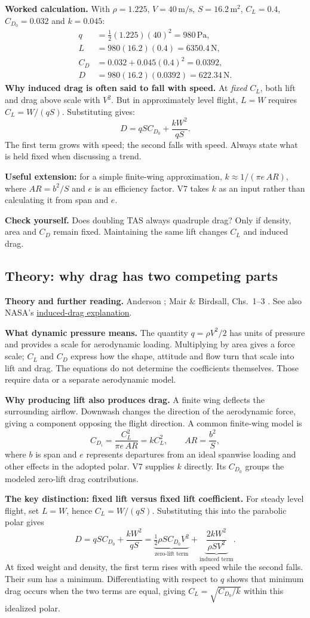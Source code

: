 \documentclass[11pt,letterpaper]{article}
\newcommand{\unit}[1]{\,\mathrm{#1}}
\newcommand{\theorypage}[1]{\clearpage\subsection*{\color{navy}\thesection\enspace Theory: #1}}
\newcommand{\reading}[1]{{\small\color{navy}\textbf{Theory and further reading.} #1\par}\vspace{3pt}}
\newcommand{\selfcheck}[1]{\par\textbf{Check yourself.} #1\par}
\begin{document}
\textbf{Worked calculation.} With $\rho=1.225$, $V=40\unit{m/s}$,
$S=16.2\unit{m^2}$, $C_L=0.4$, $C_{D_0}=0.032$ and $k=0.045$:
\begin{align*}
q&=\tfrac12(1.225)(40)^2=980\unit{Pa},\\
L&=980(16.2)(0.4)=6350.4\unit N,\\
C_D&=0.032+0.045(0.4)^2=0.0392,\\
D&=980(16.2)(0.0392)=622.34\unit N.
\end{align*}
\textbf{Why induced drag is often said to fall with speed.} At \emph{fixed}
$C_L$, both lift and drag above scale with $V^2$. But in approximately level flight,
$L=W$ requires $C_L=W/(qS)$. Substituting gives:
\[
D=qSC_{D_0}+\frac{kW^2}{qS}.
\]
The first term grows with speed; the second falls with speed. Always state what
is held fixed when discussing a trend.

\textbf{Useful extension:} for a simple finite-wing approximation,
$k\approx1/(\pi e\,AR)$, where $AR=b^2/S$ and $e$ is an efficiency factor.
V7 takes $k$ as an input rather than calculating it from span and $e$.
\selfcheck{Does doubling TAS always quadruple drag? Only if density, area and
$C_D$ remain fixed. Maintaining the same lift changes $C_L$ and induced drag.}


\theorypage{why drag has two competing parts}
\reading{Anderson \cite{anderson-performance}; Mair \& Birdsall, Chs.~1--3 \cite{mair}. See also NASA's \href{https://www1.grc.nasa.gov/beginners-guide-to-aeronautics/induced-drag-coefficient/}{induced-drag explanation}.}
\textbf{What dynamic pressure means.}
The quantity $q=\rho V^2/2$ has units of pressure and provides a scale for
aerodynamic loading. Multiplying by area gives a force scale; $C_L$ and $C_D$
express how the shape, attitude and flow turn that scale into lift and drag.
The equations do not determine the coefficients themselves. Those require
data or a separate aerodynamic model.

\textbf{Why producing lift also produces drag.}
A finite wing deflects the surrounding airflow. Downwash changes the direction
of the aerodynamic force, giving a component opposing the flight direction.
A common finite-wing model is
\[
C_{D_i}=\frac{C_L^2}{\pi e\,AR}=kC_L^2,\qquad AR=\frac{b^2}{S},
\]
where $b$ is span and $e$ represents departures from an ideal spanwise loading
and other effects in the adopted polar. V7 supplies $k$ directly. Its
$C_{D_0}$ groups the modeled zero-lift drag contributions.

\textbf{The key distinction: fixed lift versus fixed lift coefficient.}
For steady level flight, set $L=W$, hence $C_L=W/(qS)$. Substituting this into
the parabolic polar gives
\[
D=qSC_{D_0}+\frac{kW^2}{qS}
=\underbrace{\tfrac12\rho S C_{D_0}V^2}_{\text{zero-lift term}}
+\underbrace{\frac{2kW^2}{\rho S V^2}}_{\text{induced term}}.
\]
At fixed weight and density, the first term rises with speed while the second
falls. Their sum has a minimum. Differentiating with respect to $q$ shows that
minimum drag occurs when the two terms are equal, giving
$C_L=\sqrt{C_{D_0}/k}$ within this idealized polar.
\end{document}
